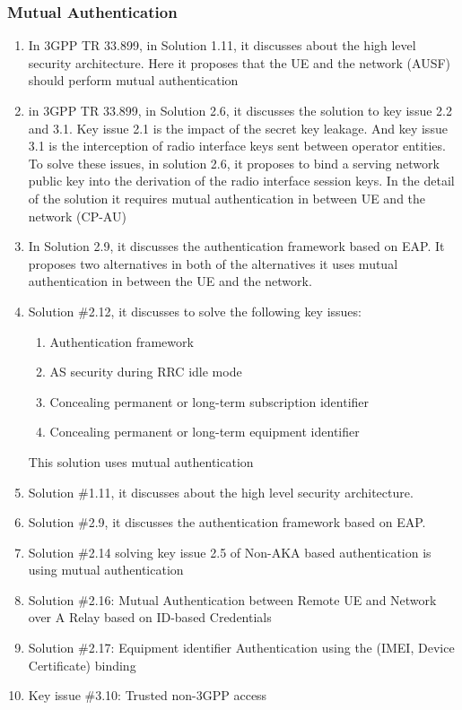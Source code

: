 \documentclass[lnicst,sechang,a4paper]{svmultln}
\begin{document}
\subsubsection{Mutual Authentication}
\begin{enumerate}
\item In 3GPP TR 33.899, in Solution 1.11, it discusses about the high level security architecture. Here it proposes that the UE and the network (AUSF) should perform mutual authentication
\item in 3GPP TR 33.899, in Solution 2.6, it discusses the solution to key issue 2.2 and 3.1. Key issue 2.1 is the impact of the secret key leakage. And key issue 3.1 is the interception of radio interface keys sent between operator entities. To solve these issues, in solution 2.6, it proposes to bind a serving network public key into the derivation of the radio interface session keys. In the detail of the solution it requires mutual authentication in between UE and the network (CP-AU)
\item In Solution 2.9, it discusses the authentication framework based on EAP. It proposes two alternatives in both of the alternatives it uses mutual authentication in between the UE and the network.
\item Solution \#2.12, it discusses to solve the following key issues:
\begin{enumerate}
\item Authentication framework
\item AS security during RRC idle mode
\item Concealing permanent or long-term subscription identifier
\item Concealing permanent or long-term equipment identifier
\end{enumerate}
This solution uses mutual authentication 
\item Solution \#1.11, it discusses about the high level security architecture.
\item Solution \#2.9, it discusses the authentication framework based on EAP.
\item Solution \#2.14 solving key issue 2.5 of Non-AKA based authentication is using mutual authentication
\item Solution \#2.16: Mutual Authentication between Remote UE and Network over A Relay based on ID-based Credentials
\item Solution \#2.17: Equipment identifier Authentication using the (IMEI, Device Certificate) binding
\item Key issue \#3.10: Trusted non-3GPP access

\end{enumerate}
\end{document}

